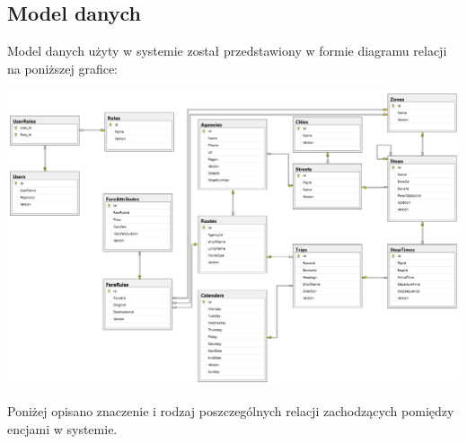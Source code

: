 \documentclass[10pt,a4paper]{article}
\begin{document}
\subsection{Model danych}
Model danych użyty w systemie został przedstawiony w formie diagramu relacji na poniższej grafice:
\begin{center}
\includegraphics[scale = 0.33]{data-model.jpg}
\end{center}
Poniżej opisano znaczenie i rodzaj poszczególnych relacji zachodzących pomiędzy encjami w systemie.
\end{document}
